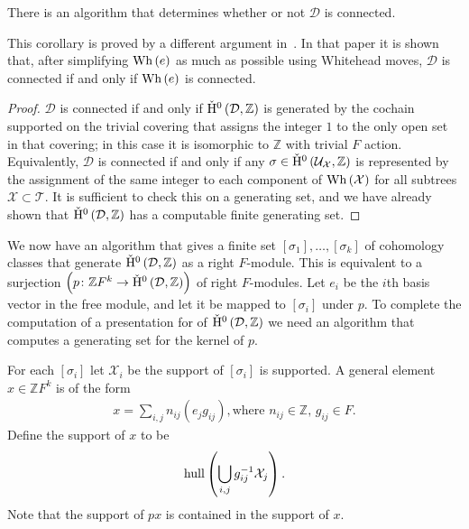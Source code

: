 \begin{cor} There is an algorithm that determines whether or not
$\mathcal{D}$ is connected. \end{cor}

This corollary is proved by a different argument in~\cite{cashenmacura11}. In that paper it
is shown that, after simplifying $\mathrm{Wh}\left(e\right)$ as much as possible using Whitehead
moves, $\mathcal{D}$ is connected if and only if $\mathrm{Wh}\left(e\right)$ is connected.

\begin{proof} $\mathcal{D}$ is connected if and only if $\check{\mathrm{H}}{}^0\left(
\mathcal{D}, \mathbb{Z}\right)$ is generated by the cochain supported on the
trivial covering that assigns the integer $1$ to the only open set in that
covering; in this case it is isomorphic to $\mathbb{Z}$ with trivial $F$
action. Equivalently, $\mathcal{D}$ is connected if and only if any $\sigma
\in \check{\mathrm{H}}{}^0\left(\mathcal{U}_\mathcal{X}, \mathbb{Z}\right)$ is represented by
the assignment of the same integer to each component of $\mathrm{Wh}\left(\mathcal{X}\right)$
for all subtrees $\mathcal{X} \subset \mathcal{T}$.  It is sufficient to
check this on a generating set, and we have already shown that $\check{\mathrm{H}}{}^0\left(
\mathcal{D}, \mathbb{Z}\right)$ has a computable finite generating
set.\end{proof}

We now have an algorithm that gives a finite set $\left[\sigma_1\right],
\ldots , \left[\sigma_k\right]$ of cohomology classes that generate
$\check{\mathrm{H}}^0\left(\mathcal{D}, \mathbb{Z}\right)$ as a right $F$-module. This is
equivalent to a surjection $\left(p \colon \mathbb{Z}F^k \to \check{\mathrm{H}}^0 \left(
\mathcal{D}, \mathbb{Z}\right)\right)$ of right $F$-modules. Let $e_i$ be
the $i$th basis vector in the free module, and let it be mapped to
$\left[\sigma_i\right]$ under $p$. To complete the computation of a
presentation for of $\check{\mathrm{H}}^0\left(\mathcal{D}, \mathbb{Z}\right)$ we need an
algorithm that computes a generating set for the kernel of $p$.

For each $\left[\sigma_i\right]$ let $\mathcal{X}_i$ be the support of
$\left[\sigma_i\right]$ is supported. A general element $x \in
\mathbb{Z}F^k$ is of the form 
\begin{align}\label{eqn:freemodule}
x = \sum\limits_{i, j} n_{ij}\left(e_{j}g_{ij}\right), \text{where $n_{ij} \in
  \mathbb{Z}$, $g_{ij} \in F$}.
\end{align}
Define the support of $x$ to be 
\begin{align}
\operatorname{\mathrm{hull}} \left(\bigcup\limits_{i, j} g_{ij}^{-1}\mathcal{X}_j\right).
\end{align}
Note that the support of $px$ is contained in the support of $x$.


